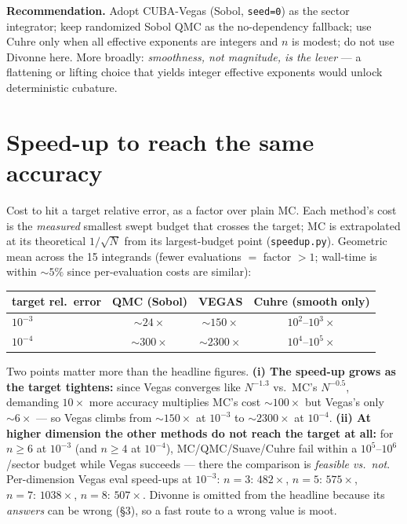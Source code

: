 \documentclass[11pt,a4paper]{article}
\newcommand{\best}[1]{\textbf{#1}}
\begin{document}
\noindent\textbf{Recommendation.} Adopt CUBA-Vegas (Sobol, \texttt{seed=0}) as the
sector integrator; keep randomized Sobol QMC as the no-dependency fallback; use
Cuhre only when all effective exponents are integers and $n$ is modest; do not
use Divonne here. More broadly: \emph{smoothness, not magnitude, is the lever} ---
a flattening or lifting choice that yields integer effective exponents would
unlock deterministic cubature.

\section{Speed-up to reach the same accuracy}
Cost to hit a target relative error, as a factor over plain MC. Each method's
cost is the \emph{measured} smallest swept budget that crosses the target; MC is
extrapolated at its theoretical $1/\sqrt N$ from its largest-budget point
(\texttt{speedup.py}). Geometric mean across the 15 integrands (fewer
evaluations $=$ factor $>1$; wall-time is within ${\sim}5\%$ since per-evaluation
costs are similar):

\begin{center}\small
\begin{tabular}{@{}lccc@{}}
\toprule
target rel.\ error & QMC (Sobol) & \textbf{VEGAS} & Cuhre (smooth only) \\
\midrule
$10^{-3}$ & ${\sim}24\times$  & \best{${\sim}150\times$}  & $10^{2}$--$10^{3}\times$ \\
$10^{-4}$ & ${\sim}300\times$ & \best{${\sim}2300\times$} & $10^{4}$--$10^{5}\times$ \\
\bottomrule
\end{tabular}
\end{center}

\noindent Two points matter more than the headline figures. \textbf{(i) The
speed-up grows as the target tightens:} since Vegas converges like $N^{-1.3}$
vs.\ MC's $N^{-0.5}$, demanding $10\times$ more accuracy multiplies MC's cost
${\sim}100\times$ but Vegas's only ${\sim}6\times$ --- so Vegas climbs from
${\sim}150\times$ at $10^{-3}$ to ${\sim}2300\times$ at $10^{-4}$.
\textbf{(ii) At higher dimension the other methods do not reach the target at
all:} for $n\ge6$ at $10^{-3}$ (and $n\ge4$ at $10^{-4}$), MC/QMC/Suave/Cuhre
fail within a $10^5$--$10^6$/sector budget while Vegas succeeds --- there the
comparison is \emph{feasible vs.\ not}. Per-dimension Vegas eval speed-ups at
$10^{-3}$: $n{=}3{:}\,482\times$, $n{=}5{:}\,575\times$, $n{=}7{:}\,1038\times$,
$n{=}8{:}\,507\times$. Divonne is omitted from the headline because its
\emph{answers} can be wrong (\S3), so a fast route to a wrong value is moot.
\end{document}
